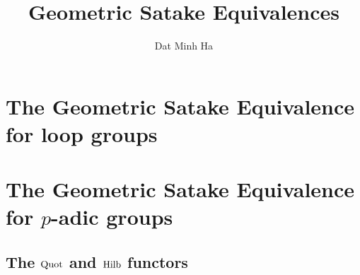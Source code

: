 

\setcounter{section}{-1}





    \title{Geometric Satake Equivalences}
    
    \author{Dat Minh Ha}
    \maketitle
    
    \begin{abstract}
    
    \end{abstract}
    
    {
        \hypersetup{} 
        \tableofcontents %
    }
    
    \chapter{The Geometric Satake Equivalence for loop groups}
        \begin{abstract}
            
        \end{abstract}
        
        \minitoc
    
        
        
    \chapter{The Geometric Satake Equivalence for \texorpdfstring{$p$}{}-adic groups}
        
    \begin{appendices}
        \chapter{The \texorpdfstring{$\mathrm{Quot}$}{} and \texorpdfstring{$\mathrm{Hilb}$}{} functors}
            \begin{abstract}
            
            \end{abstract}
            
            \minitoc
            
            
            
            
            
            
            
    \end{appendices}
    
    \printbibliography


